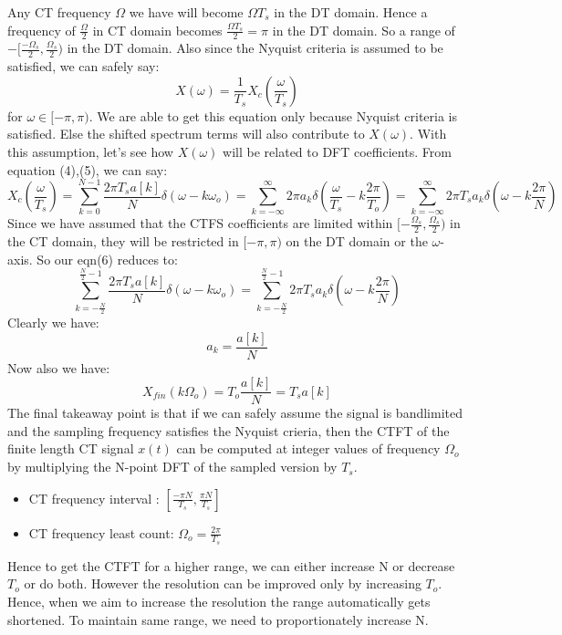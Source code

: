 \documentclass[12pt, a4paper]{article}
\begin{document}
Any CT frequency $\Omega$ we have will become $\Omega T_{s}$ in the DT domain. Hence a frequency of $\frac{\Omega}{2}$ in CT domain becomes $\frac{\Omega T_{s}}{2} = \pi$ in the DT domain. So a range of $-[\frac{-\Omega _{s}}{2}, \frac{\Omega_{s}}{2})$ in the DT domain. Also since the Nyquist criteria is assumed to be satisfied, we can safely say:
\begin{equation}
    X(\omega) = \frac{1}{T_{s}}X_{c}(\frac{\omega}{T_{s}})
\end{equation} 
for $\omega \in [-\pi,\pi)$. We are able to get this equation only because Nyquist criteria is satisfied. Else the shifted spectrum terms will also contribute to $X(\omega)$. With this assumption, let's see how $X(\omega)$ will be related to DFT coefficients. From equation (4),(5), we can say:
\begin{equation}
    X_{c}(\frac{\omega}{T_{s}}) = \sum_{k=0}^{N-1}\frac{2\pi T_{s}a[k]}{N}\delta(\omega - k\omega_{o}) = \sum_{k=-\infty}^{\infty}2\pi a_{k}\delta(\frac{\omega}{T_{s}}-k\frac{2\pi}{T_{o}}) = \sum_{k=-\infty}^{\infty}2\pi T_{s}a_{k}\delta(\omega-k\frac{2\pi}{N})
\end{equation}
Since we have assumed that the CTFS coefficients are limited within $[-\frac{\Omega_{s}}{2},\frac{\Omega_{s}}{2})$ in the CT domain, they will be restricted in $[-\pi,\pi)$ on the DT domain or the $\omega$-axis. So our eqn(6) reduces to:
\begin{equation*}
    \sum_{k=-\frac{N}{2}}^{\frac{N}{2}-1}\frac{2\pi T_{s}a[k]}{N} \delta(\omega - k\omega_{o}) = \sum_{k=-\frac{N}{2}}^{\frac{N}{2}-1}2\pi T_{s}a_{k} \delta(\omega - k\frac{2\pi}{N})
\end{equation*}
Clearly we have:
\begin{equation}
    a_{k} = \frac{a[k]}{N}
\end{equation}
Now also we have:
\begin{equation}
    X_{fin}(k\Omega_{o}) = T_{o}\frac{a[k]}{N} = T_{s}a[k]
\end{equation}
The final takeaway point is that if we can safely assume the signal is bandlimited and the sampling frequency satisfies the Nyquist crieria, then the CTFT of the finite length CT signal $x(t)$ can be computed at integer values of frequency $\Omega_{o}$ by multiplying the N-point DFT of the sampled version by $T_{s}$.
\begin{itemize}
    \item CT frequency interval : $[\frac{-\pi N}{T_{s}},\frac{\pi N}{T_{s}}]$
    \item CT frequency least count: $\Omega_{o} = \frac{2 \pi}{T_{s}}$
\end{itemize}
Hence to get the CTFT for a higher range, we can either increase N or decrease $T_{o}$ or do both. However the resolution can be improved only by increasing $T_{o}$. Hence, when we aim to increase the resolution the range automatically gets shortened. To maintain same range, we need to proportionately increase N.
\end{document}
